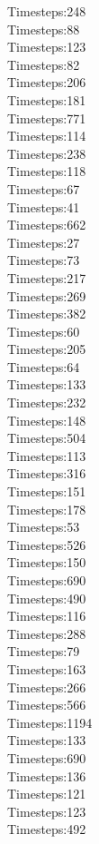 \documentclass{article}
\begin{document}
Timesteps:248\\
Timesteps:88\\
Timesteps:123\\
Timesteps:82\\
Timesteps:206\\
Timesteps:181\\
Timesteps:771\\
Timesteps:114\\
Timesteps:238\\
Timesteps:118\\
Timesteps:67\\
Timesteps:41\\
Timesteps:662\\
Timesteps:27\\
Timesteps:73\\
Timesteps:217\\
Timesteps:269\\
Timesteps:382\\
Timesteps:60\\
Timesteps:205\\
Timesteps:64\\
Timesteps:133\\
Timesteps:232\\
Timesteps:148\\
Timesteps:504\\
Timesteps:113\\
Timesteps:316\\
Timesteps:151\\
Timesteps:178\\
Timesteps:53\\
Timesteps:526\\
Timesteps:150\\
Timesteps:690\\
Timesteps:490\\
Timesteps:116\\
Timesteps:288\\
Timesteps:79\\
Timesteps:163\\
Timesteps:266\\
Timesteps:566\\
Timesteps:1194\\
Timesteps:133\\
Timesteps:690\\
Timesteps:136\\
Timesteps:121\\
Timesteps:123\\
Timesteps:492\\
\end{document}
